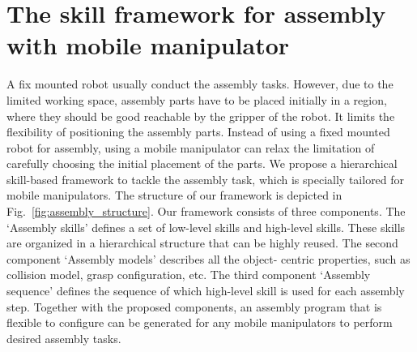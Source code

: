 \section{The skill framework for assembly with mobile manipulator}
A fix mounted robot usually conduct the assembly tasks. However, due to the limited working space, assembly parts have to be placed initially in a region, where they should be good reachable by the gripper of the robot. It limits the flexibility of positioning the assembly parts. Instead of using a fixed mounted robot for assembly, using a mobile manipulator can relax the limitation of carefully choosing the initial placement of the parts. We propose a hierarchical skill-based framework to tackle the assembly task, which is specially tailored for mobile manipulators. The structure of our framework is depicted in Fig.~\ref{fig:assembly_structure}. Our framework consists of three components. The `Assembly skills' defines a set of low-level skills and high-level skills. These skills are organized in a hierarchical structure that can be highly reused. The second component `Assembly models' describes all the object- centric properties, such as collision model, grasp configuration, etc. The third component `Assembly sequence' defines the sequence of which high-level skill is used for each assembly step. Together with the proposed components, an assembly program that is flexible to configure can be generated for any mobile manipulators to perform desired assembly tasks. 

